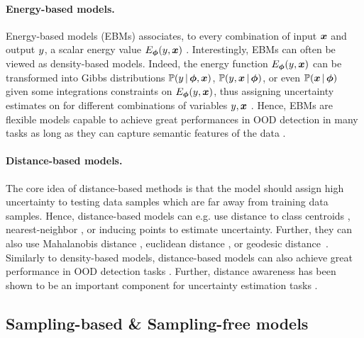 \paragraph*{Energy-based models.} Energy-based models (EBMs) associates, to every combination of input $\bm{x}$ and output $y$, a scalar energy value $E_{\bm{\phi}}(y, \bm{x})$ \cite{lecun2006tutorial}. Interestingly, EBMs can often be viewed as density-based models. Indeed, the energy function $E_{\bm{\phi}}(y, \bm{x})$ can be transformed into Gibbs distributions $\mathbb{P}(y \,|\, \bm{\phi}, \bm{x})$, $\mathbb{P}(y, \bm{x} \,|\, \bm{\phi})$, or even $\mathbb{P}(\bm{x} \,|\, \bm{\phi})$ given some integrations constraints on $E_{\bm{\phi}}(y, \bm{x})$, thus assigning uncertainty estimates on for different combinations of variables $y, \bm{x}$ \cite{energy_based_classifier}. Hence, EBMs are flexible models capable to achieve great performances in OOD detection in many tasks \citep{energy-ood,wang2021ebm} as long as they can capture semantic features of the data \cite{ood_ebm}.

\paragraph*{Distance-based models.} The core idea of distance-based methods is that the model should assign high uncertainty to testing data samples which are far away from training data samples. Hence, distance-based models can e.g. use distance to class centroids \cite{mohseni2020self}, nearest-neighbor \cite{sun2022knnood}, or inducing points \cite{due} to estimate uncertainty. Further, they can also use Mahalanobis distance \cite{mohseni2020self}, euclidean distance \cite{huang2021feature}, or geodesic distance \cite{gomes2022igeood}. Similarly to density-based models, distance-based models can also achieve great performance in OOD detection tasks \cite{ood-detection-survey}. Further, distance awareness has been shown to be an important component for uncertainty estimation tasks \cite{uncertainty-distance-awareness,due}.

\subsection{Sampling-based \& Sampling-free models}

